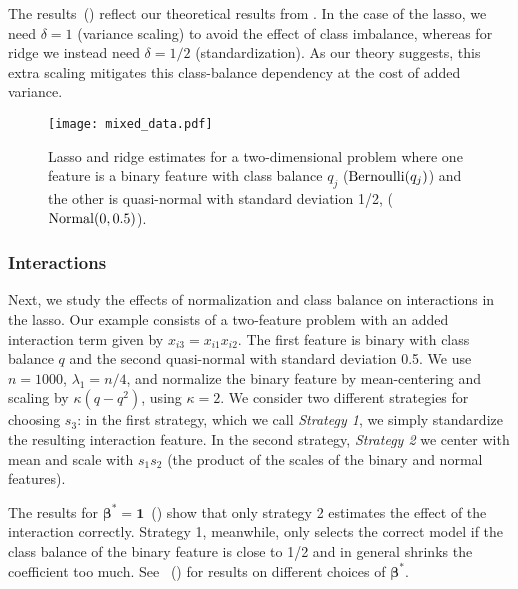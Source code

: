 The results~() reflect our theoretical results from
. In the case of the lasso, we need \(\delta =1\) (variance scaling) to
avoid the effect of class imbalance, whereas for ridge we instead need \(\delta =1/2\)
(standardization). As our theory suggests, this extra scaling mitigates this class-balance
dependency at the cost of added variance.

\begin{figure}[htpb]
  \centering
  \texttt{[image: mixed\_data.pdf]}
  \caption{%
    Lasso and ridge estimates for a two-dimensional problem where one feature is a binary
    feature with class balance \(q_j\) (\(\operatorname{Bernoulli}(q_j)\)) and the other is quasi-normal
    with standard deviation 1/2, (\(\operatorname{Normal}(0, 0.5)\)).
  }
  \label{fig:lasso-ridge-comparison}
\end{figure}

\subsubsection{Interactions}\label{sec:experiments-interactions}

Next, we study the effects of normalization and class balance on interactions in the lasso.
Our example consists of a two-feature problem with an added interaction term given by
\(x_{i3} = x_{i1}x_{i2}\). The first feature is binary with class balance \(q\) and the
second quasi-normal with standard deviation 0.5. We use \(n=1000\), \(\lambda_1 = n/4\),
and normalize the binary feature by mean-centering and scaling by \(\kappa (q - q^2)\),
using \(\kappa = 2\). We consider two different strategies for choosing \(s_3\): in the
first strategy, which we call \emph{Strategy 1}, we simply standardize the resulting
interaction feature.
In the second strategy, \emph{Strategy 2} we center with mean and scale with \(s_1s_2\)
(the product of the scales of the binary and normal features).

The results for \(\bm{\beta}^* = \bm{1}\)~() show that only strategy
2 estimates the effect of the interaction correctly. Strategy 1, meanwhile, only selects
the correct model if the class balance of the binary feature is close to 1/2 and in general
shrinks the coefficient too much. See
~() for results
on different choices of \(\bm{\beta}^*\).


